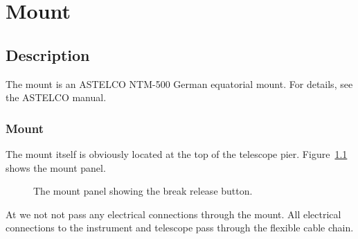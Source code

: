 \chapter{Mount}
\label{chapter:mount}

\section{Description}

The mount is an ASTELCO NTM-500 German equatorial mount. For details, see the ASTELCO manual. 

\subsection{Mount}

The mount itself is obviously located at the top of the telescope pier.
Figure~\ref{figure:mount-panel} shows the mount panel.

\begin{figure}
\begin{center}
\end{center}
\caption{The mount panel showing the break release button.}
\label{figure:mount-panel}
\end{figure}

\ifcoatli
At {\projectname} we not not pass any electrical connections through the mount. All electrical connections to the instrument and telescope pass through the flexible cable chain.
\fi

